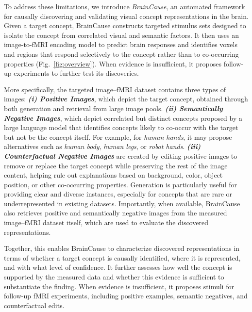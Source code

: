 \documentclass{llmxive}
\begin{document}
To address these limitations, we introduce \emph{BrainCause}, an automated framework for causally discovering and validating visual concept representations in the brain. Given a target concept, BrainCause constructs targeted stimulus sets designed to isolate the concept from correlated visual and semantic factors. It then uses an image-to-fMRI encoding model to predict brain responses and identifies voxels and regions that respond selectively to the concept rather than to co-occurring properties (Fig.~\ref{fig:overview}). When evidence is insufficient, it proposes follow-up experiments to further test its discoveries.

More specifically, the targeted image--fMRI dataset contains three types of images: \emph{\textbf{(i) Positive Images}}, which depict the target concept, obtained through both generation and retrieval from large image pools. \emph{\textbf{(ii) Semantically Negative Images}}, which depict correlated but distinct concepts proposed by a large language model that identifies concepts likely to co-occur with the target but not be the concept itself. For example, for \emph{human hands}, it may propose alternatives such as \emph{human body}, \emph{human legs}, or \emph{robot hands}. \emph{\textbf{(iii) Counterfactual Negative Images}} are created by editing positive images to remove or replace the target concept while preserving the rest of the image content, helping rule out explanations based on background, color, object position, or other co-occurring properties. Generation is particularly useful for providing clear and diverse instances, especially for concepts that are rare or underrepresented in existing datasets. Importantly, when available, BrainCause also retrieves positive and semantically negative images from the measured image--fMRI dataset itself, which are used to evaluate the discovered representations.

Together, this enables BrainCause to characterize discovered representations in terms of whether a target concept is causally identified, where it is represented, and with what level of confidence. It further assesses how well the concept is supported by the measured data and whether this evidence is sufficient to substantiate the finding. When evidence is insufficient, it proposes stimuli for follow-up fMRI experiments, including positive examples, semantic negatives, and counterfactual edits.
\end{document}
